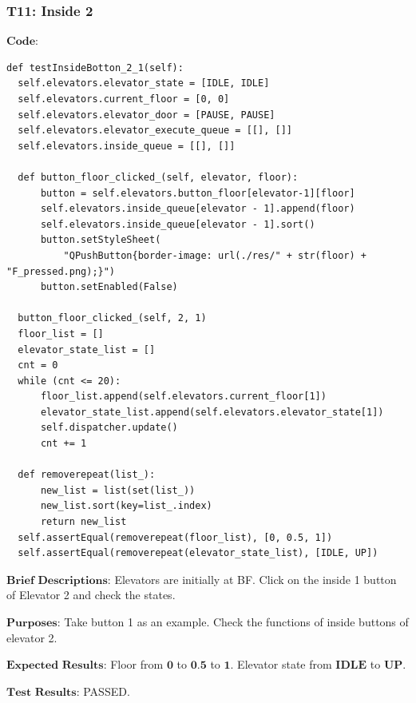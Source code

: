 \documentclass{article}
\begin{document}
\subsubsection*{T11: Inside 2}
$\textbf{Code:}$
\begin{lstlisting}
def testInsideBotton_2_1(self):
  self.elevators.elevator_state = [IDLE, IDLE]
  self.elevators.current_floor = [0, 0]
  self.elevators.elevator_door = [PAUSE, PAUSE]
  self.elevators.elevator_execute_queue = [[], []]
  self.elevators.inside_queue = [[], []]

  def button_floor_clicked_(self, elevator, floor):
      button = self.elevators.button_floor[elevator-1][floor]
      self.elevators.inside_queue[elevator - 1].append(floor)
      self.elevators.inside_queue[elevator - 1].sort()
      button.setStyleSheet(
          "QPushButton{border-image: url(./res/" + str(floor) + "F_pressed.png);}")
      button.setEnabled(False)

  button_floor_clicked_(self, 2, 1)
  floor_list = []
  elevator_state_list = []
  cnt = 0
  while (cnt <= 20):
      floor_list.append(self.elevators.current_floor[1])
      elevator_state_list.append(self.elevators.elevator_state[1])
      self.dispatcher.update()
      cnt += 1

  def removerepeat(list_):
      new_list = list(set(list_))
      new_list.sort(key=list_.index)
      return new_list
  self.assertEqual(removerepeat(floor_list), [0, 0.5, 1])
  self.assertEqual(removerepeat(elevator_state_list), [IDLE, UP])
\end{lstlisting}

$\textbf{Brief Descriptions:}$
Elevators are initially at BF. Click on the inside 1 button of Elevator 2 and check the states.

$\textbf{Purposes:}$
Take button 1 as an example. Check the functions of inside buttons of elevator 2.

$\textbf{Expected Results:}$
Floor from $\textbf{0}$ to $\textbf{0.5}$ to $\textbf{1}$. Elevator state from $\textbf{IDLE}$ to $\textbf{UP}$.

$\textbf{Test Results:}$
PASSED.
\end{document}

